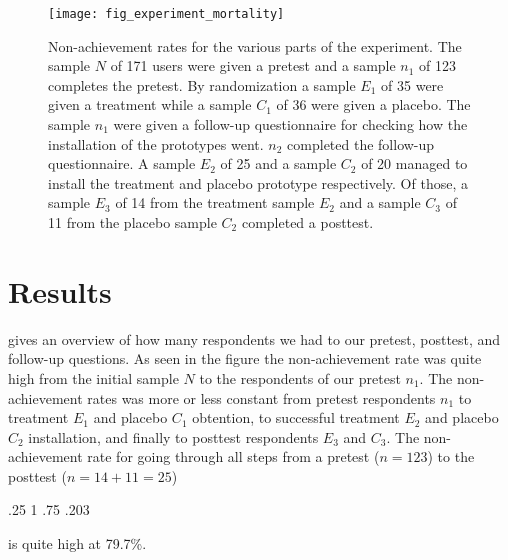 \begin{figure}
  \begin{whole}
  \texttt{[image: fig\_experiment\_mortality]}
  \caption[Experiment Non-Achievement Rates]{
    Non-achievement rates for the various parts of the experiment.
    The sample $N$ of 171 \urort{} users were given a pretest and
    a sample $n_1$ of 123 completes the pretest.
    By randomization a sample $E_1$ of 35 were given a treatment while
    a sample $C_1$ of 36 were given a placebo.
    The sample $n_1$ were given a follow-up questionnaire for checking
    how the installation of the prototypes went. $n_2$ completed the follow-up
    questionnaire.
    A sample $E_2$ of 25 and a sample $C_2$ of 20 managed to install
    the treatment and placebo prototype respectively.
    Of those, a sample $E_3$ of 14 from the treatment sample $E_2$ and
    a sample $C_3$ of 11 from the placebo sample $C_2$ completed
    a posttest.
  }
  \label{figure:fig.experiment.mortality}
  \end{whole}
\end{figure}

\section{Results}

 gives an overview of how many respondents
we had to our pretest, posttest, and follow-up questions. As seen in the
figure the non-achievement rate was quite high from the initial sample $N$ to
the respondents of our pretest $n_1$. The non-achievement
rates was more or less constant from pretest respondents $n_1$ to treatment
$E_1$ and placebo $C_1$ obtention, to successful treatment $E_2$ and placebo
$C_2$ installation, and finally to posttest respondents $E_3$ and $C_3$.
The non-achievement rate for going through
all steps from a pretest ($n = 123$) to the posttest ($n = 14 + 11 = 25$)
\begin{sparkline}{3}
  \sparkspike .25  1
  \sparkspike .75  .203
\end{sparkline}
is quite high at 79.7\%.

